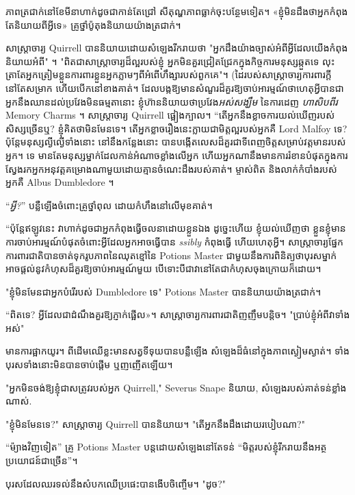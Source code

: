 {{ភាពត្រជាក់នៅខែមីនាហាក់ដូចជាកាន់តែជ្រៅ សីតុណ្ហភាពធ្លាក់ចុះបន្ថែមទៀត។ «ខ្ញុំ​មិន​ដឹង​ថា​អ្នក​កំពុង​តែ​និយាយ​ពី​អ្វី​ទេ» គ្រូ​ថ្នាំ​ប៉ូតុង​និយាយ​យ៉ាង​ត្រជាក់។

សាស្ត្រាចារ្យ Quirrell បាននិយាយដោយសំឡេងរីករាយថា "អ្នកដឹងយ៉ាងច្បាស់អំពីអ្វីដែលយើងកំពុងនិយាយអំពី" ។ "ពិតជាសាស្រ្តាចារ្យដ៏ល្អរបស់ខ្ញុំ អ្នកមិនគួរជ្រៀតជ្រែកក្នុងកិច្ចការមនុស្សឆ្កួតទេ លុះត្រាតែអ្នកត្រៀមខ្លួនការពារខ្លួនអ្នកភ្លាមៗពីអំពើហឹង្សារបស់ពួកគេ"។ (ដៃរបស់សាស្ត្រាចារ្យការពារក្តីនៅតែសម្រាក ហើយបើកនៅខាងគាត់។ ដែលបង្កឱ្យមានសំណួរដ៏គួរឱ្យចាប់អារម្មណ៍ថាហេតុអ្វីបានជាអ្នកនឹងឈានដល់ប្រវែងមិនធម្មតានោះ ខ្ញុំហ៊ាននិយាយថាប្រវែង\emph{អស់សង្ឃឹម} នៃការដេញ \emph{ហាសិបពីរ} Memory Charms ។ សាស្រ្តាចារ្យ Quirrell ផ្អៀងក្បាល។ “តើ​អ្នក​នឹង​ខ្លាច​ការ​យល់​ឃើញ​របស់​សិស្ស​ច្រើន​ឬ? ខ្ញុំគិតថាមិនមែនទេ។ តើ​អ្នក​ខ្លាច​រឿង​នេះ​ក្លាយ​ជា​មិត្ត​ល្អ​របស់​អ្នក​គឺ Lord Malfoy ទេ? ប៉ុន្តែមនុស្សល្ងីល្ងើទាំងនោះ នៅនឹងកន្លែងនោះ បានបង្កើតលេសដ៏គួរជាទីពេញចិត្តសម្រាប់វត្តមានរបស់អ្នក។ ទេ មានតែមនុស្សម្នាក់ដែលកាន់អំណាចខ្លាំងលើអ្នក ហើយអ្នកណានឹងមានការរំខានបំផុតក្នុងការស្វែងរកអ្នកអនុវត្តគម្រោងណាមួយដោយគ្មានចំណេះដឹងរបស់គាត់។ ម្ចាស់ពិត និងលាក់កំបាំងរបស់អ្នកគឺ Albus Dumbledore ។

“\emph{អ្វី?}” បន្លឺ​ឡើង​ចំពោះ​គ្រូ​ថ្នាំ​ពុល ដោយ​កំហឹង​នៅ​លើ​មុខ​គាត់។

“ប៉ុន្តែឥឡូវនេះ វាហាក់ដូចជាអ្នកកំពុងធ្វើចលនាដោយខ្លួនឯង ដូច្នេះហើយ ខ្ញុំយល់ឃើញថា ខ្លួនខ្ញុំមានការចាប់អារម្មណ៍បំផុតចំពោះអ្វីដែលអ្នកអាចធ្វើបាន \emph{ssibly} កំពុងធ្វើ ហើយហេតុអ្វី។ សាស្រ្តាចារ្យផ្នែកការពារជាតិបានចាត់ទុករូបភាពនៃឈុតខ្មៅនៃ Potions Master ជាមួយនឹងការពិនិត្យថាបុរសម្នាក់អាចផ្តល់នូវកំហុសដ៏គួរឱ្យចាប់អារម្មណ៍មួយ បើទោះបីជាវានៅតែជាកំហុសចុងក្រោយក៏ដោយ។

"ខ្ញុំមិនមែនជាអ្នកបំរើរបស់ Dumbledore ទេ" Potions Master បាននិយាយយ៉ាងត្រជាក់។

“ពិតទេ? អ្វី​ដែល​ជា​ដំណឹង​គួរ​ឱ្យ​ភ្ញាក់​ផ្អើល»។ សាស្ត្រាចារ្យការពារជាតិញញឹមបន្តិច។ "ប្រាប់ខ្ញុំអំពីវាទាំងអស់"

មានការផ្អាកយូរ។ ពីដើមឈើខ្លះមានសត្វទីទុយបានបន្លឺឡើង សំឡេងដ៏ធំនៅក្នុងភាពស្ងៀមស្ងាត់។ ទាំង​បុរស​ទាំង​នោះ​មិន​បាន​ចាប់​ផ្តើម ឬ​ញញើត​ឡើយ។

"អ្នក​មិន​ចង់​ឱ្យ​ខ្ញុំ​ជា​សត្រូវ​របស់​អ្នក Quirrell," Severus Snape និយាយ, សំឡេង​របស់​គាត់​ទន់​ខ្លាំង​ណាស់.

"ខ្ញុំមិនមែនទេ?" សាស្ត្រាចារ្យ Quirrell បាននិយាយ។ "តើអ្នកនឹងដឹងដោយរបៀបណា?"

“ម៉្យាងវិញទៀត” គ្រូ Potions Master បន្តដោយសំឡេងនៅតែទន់ “មិត្តរបស់ខ្ញុំរីករាយនឹងអត្ថប្រយោជន៍ជាច្រើន”។

បុរស​ដែល​ឈរ​ទល់​នឹង​សំបក​ឈើ​ប្រផេះ​បាន​ងើប​ចិញ្ចើម។ "ដូច?"

}}
